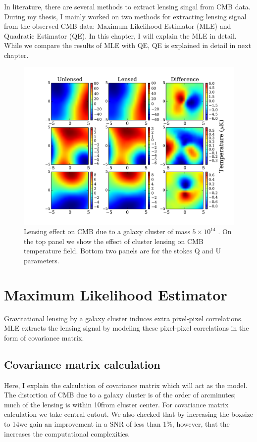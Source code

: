 In literature, there are several methods to extract lensing singal from CMB data. 
During my thesis, I mainly worked on two methods for extracting lensing signal from the observed CMB data: Maximum Likelihood Estimator (MLE) and Quadratic Estimator (QE). 
In this chapter, I will explain the MLE in detail. While we compare the results of MLE with QE, QE is explained in detail in next chapter.
\begin{figure}[t]
\begin{center}
\includegraphics[width=\linewidth, keepaspectratio]{figs/lensing_signal.pdf}
 \caption{Lensing effect on CMB due to a galaxy cluster of mass $5\times 10^{14}$ \msolar.
  On the top panel we show the effect of cluster lensing on CMB temperature field.
  Bottom two panels are for the stokes Q and U parameters. 
 } 
\label{fig:lensing_signal}
\end{center}
\end{figure}

\section{Maximum Likelihood Estimator}
\label{sec_MLE}
Gravitational lensing by a galaxy cluster induces extra pixel-pixel correlations. 
MLE extracts the lensing signal by modeling these pixel-pixel correlations in the form of covariance matrix.


\subsection{Covariance matrix calculation}
Here, I explain the calculation of covariance matrix which will act as the model.
The distortion of CMB due to a galaxy cluster is of the order of arcminutes; much of the lensing is within 10\am from cluster center.
For covariance matrix calculation we take central \smallboxsize cutout.
We also checked that by increasing the boxsize to 14\am we gain an improvement in a SNR of less than 1\%, however, that the increases the computational complexities. 



